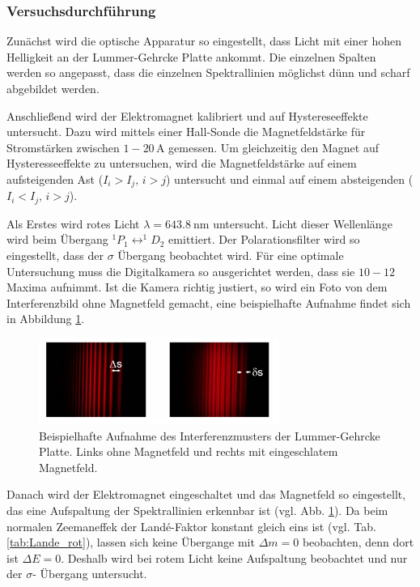 \subsubsection{Versuchsdurchführung}
Zunächst wird die optische Apparatur so eingestellt, dass Licht mit einer hohen Helligkeit %
an der Lummer-Gehrcke Platte ankommt. Die einzelnen Spalten werden so angepasst, dass die %
einzelnen Spektrallinien möglichst dünn und scharf abgebildet werden.

Anschließend wird der Elektromagnet kalibriert und auf Hystereseeffekte untersucht.
Dazu wird mittels einer Hall-Sonde die Magnetfeldstärke für Stromstärken
zwischen $\num{1}-\num{20}\,\si{\ampere}$ gemessen. Um gleichzeitig den Magnet auf Hysteresseeffekte zu untersuchen,
wird die Magnetfeldstärke auf einem aufsteigenden Ast ($I_i>I_j,\, i>j$) untersucht und einmal auf einem absteigenden ($I_i<I_j,\, i>j$).

Als Erstes wird rotes Licht $\lambda = \SI{643.8}{\nano\meter}$ untersucht.
Licht dieser Wellenlänge wird beim Übergang $^1P_1\leftrightarrow ^1\!\!D_2$ emittiert.
Der Polarationsfilter wird so eingestellt, dass der $\sigma$ Übergang beobachtet wird. 
Für eine optimale Untersuchung muss die Digitalkamera so ausgerichtet werden, dass sie $10-12$ Maxima aufnimmt.
Ist die Kamera richtig justiert, so wird ein Foto von dem Interferenzbild ohne Magnetfeld gemacht, eine beispielhafte Aufnahme
findet sich in Abbildung \ref{fig: bsp_foto}.
\FloatBarrier
\begin{figure}[h]
  \centering
  \includegraphics[width=0.7\textwidth]{pics/bsp_foto.png}
  \caption{Beispielhafte Aufnahme des Interferenzmusters der Lummer-Gehrcke Platte. %
  Links ohne Magnetfeld und rechts mit eingeschlatem Magnetfeld\cite{anleitung27}.}
  \label{fig: bsp_foto}
\end{figure}
\FloatBarrier
Danach wird der Elektromagnet eingeschaltet und das Magnetfeld so eingestellt, das eine Aufspaltung der
Spektrallinien erkennbar ist (vgl. Abb. \ref{fig: bsp_foto}). Da beim normalen Zeemaneffek
der Landé-Faktor konstant gleich eins ist (vgl. Tab. \ref{tab:Lande_rot}), lassen sich keine %
Übergange mit $\Delta m=0$ beobachten, denn dort ist $\Delta E=0$. Deshalb wird bei rotem Licht keine Aufspaltung
beobachtet und nur der $\sigma$- Übergang untersucht.  %


